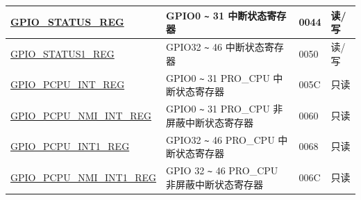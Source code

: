 \begin{longtable}{ | p{6cm} | p{7.2cm} | p{1.3cm} | p{1cm} | }
\hyperref[regdesc:GPIOSTATUSREG]{GPIO\_STATUS\_REG} & GPIO0 \verb+~+ 31 中断状态寄存器 & \hexprefix{}0044 & 读/写 \\ \hline
\hyperref[regdesc:GPIOSTATUS1REG]{GPIO\_STATUS1\_REG} & GPIO32 \verb+~+ 46 中断状态寄存器 & \hexprefix{}0050 & 读/写 \\ \hline
\hyperref[regdesc:GPIOPCPUINTREG]{GPIO\_PCPU\_INT\_REG} & GPIO0 \verb+~+ 31 PRO\_CPU 中断状态寄存器 & \hexprefix{}005C & 只读 \\ \hline
\hyperref[regdesc:GPIOPCPUNMIINTREG]{GPIO\_PCPU\_NMI\_INT\_REG} & GPIO0 \verb+~+ 31 PRO\_CPU 非屏蔽中断状态寄存器 & \hexprefix{}0060 & 只读 \\ \hline
\hyperref[regdesc:GPIOPCPUINT1REG]{GPIO\_PCPU\_INT1\_REG} & GPIO32 \verb+~+ 46 PRO\_CPU 中断状态寄存器 & \hexprefix{}0068 & 只读 \\ \hline
\hyperref[regdesc:GPIOPCPUNMIINT1REG]{GPIO\_PCPU\_NMI\_INT1\_REG} &GPIO 32 \verb+~+ 46 PRO\_CPU 非屏蔽中断状态寄存器 & \hexprefix{}006C & 只读 \\ \hline
\end{longtable}
